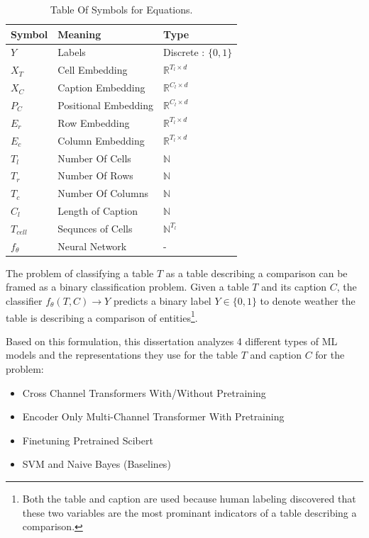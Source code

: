 \begin{table}
    \label{table\arabic{tablecounter}}
    \centering
    \begin{tabular}{|l|l|l|}
        \hline
        Symbol & Meaning & Type \\ \hline
        $Y$ & Labels & Discrete : $\{0,1\}$ \\ \hline
        $X_T$ & Cell Embedding & $\mathbb{R}^{T_l \times d}$\\ \hline
        $X_C$ & Caption Embedding & $\mathbb{R}^{C_l \times d}$ \\ \hline
        $P_C$ & Positional Embedding & $\mathbb{R}^{C_l \times d}$ \\ \hline
        $E_r$ & Row Embedding & $\mathbb{R}^{T_l \times d}$ \\ \hline
        $E_c$ & Column Embedding & $\mathbb{R}^{T_l \times d}$ \\ \hline
        $T_l$ & Number Of Cells & $\mathbb{N}$ \\ \hline
        $T_r$ & Number Of Rows & $\mathbb{N}$ \\ \hline
        $T_c$ & Number Of Columns & $\mathbb{N}$ \\ \hline
        $C_l$ & Length of Caption & $\mathbb{N}$ \\ \hline
        $T_{cell}$ & Sequnces of Cells & $\mathbb{N}^{T_l}$ \\ \hline
        $f_\theta$ & Neural Network & - \\ \hline
    \end{tabular}
    \caption{\label{tablecounter} Table Of Symbols for Equations. }
\end{table}
The problem of classifying a table $T$ as a table describing a comparison can be framed as a binary classification problem. Given a table $T$ and its caption $C$, the classifier $f_\theta(T,C) \rightarrow Y$ predicts a binary label $Y \in \{0,1\}$ to denote weather the table is describing a comparison of entities\footnote{Both the table and caption are used because human labeling discovered that these two variables are the most prominant indicators of a table describing a comparison.}. 

Based on this formulation, this dissertation analyzes 4 different types of ML models and the representations they use for the table $T$ and caption $C$ for the problem:
\begin{itemize}
    \item Cross Channel Transformers With/Without Pretraining
    \item Encoder Only Multi-Channel Transformer With Pretraining
    \item Finetuning Pretrained Scibert
    \item SVM and Naive Bayes (Baselines)
\end{itemize}

